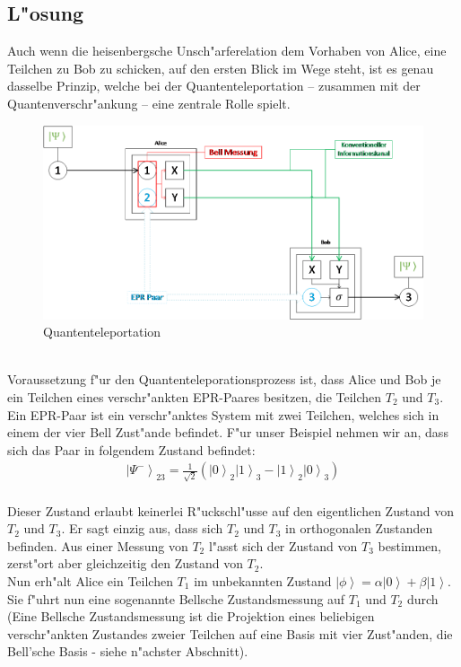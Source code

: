 \begin{refsection}
\section{L"osung}
Auch wenn die heisenbergsche Unsch"arferelation dem Vorhaben von Alice, eine Teilchen zu Bob zu schicken, auf den ersten Blick im Wege steht, ist es genau dasselbe Prinzip, welche bei der Quantenteleportation – zusammen mit der Quantenverschr"ankung – eine zentrale Rolle spielt.
\begin{figure}
	\center
	\includegraphics[width=1\textwidth]{teleport/image/quantum_teleportation.png}
	\caption{Quantenteleportation}
	\label{Quantenteleportation}
\end{figure}
\\
Voraussetzung f"ur den Quantenteleporationsprozess ist, dass Alice und Bob je ein Teilchen eines verschr"ankten EPR-Paares besitzen, die Teilchen $T_{2}$ und $T_{3}$. Ein EPR-Paar ist ein verschr"anktes System mit zwei Teilchen, welches sich in einem der vier Bell Zust"ande befindet. F"ur unser Beispiel nehmen wir an, dass sich das Paar in folgendem Zustand befindet:
\begin{align}\label{eq:bell_state1}
\left|\Psi^{-}\right\rangle_{23} = \frac{1}{\sqrt{2}} ( \left|0\right\rangle_{2}\left|1\right\rangle_{3} - \left|1\right\rangle_{2}\left|0\right\rangle_{3} )
\end{align}
\\
Dieser Zustand erlaubt keinerlei R"uckschl"usse auf den eigentlichen Zustand von $T_{2}$ und $T_{3}$. Er sagt einzig aus, dass sich $T_{2}$ und $T_{3}$ in orthogonalen Zustanden befinden. Aus einer Messung von $T_{2}$ l"asst sich der Zustand von $T_{3}$ bestimmen, zerst"ort aber gleichzeitig den Zustand von $T_{2}$. 
\\
Nun erh"alt Alice ein Teilchen $T_{1}$ im unbekannten Zustand $\left|\phi\right\rangle = \alpha\left|0\right\rangle + \beta\left|1\right\rangle$. Sie f"uhrt nun eine sogenannte Bellsche Zustandsmessung auf $T_{1}$ und $T_{2}$ durch (Eine Bellsche Zustandsmessung ist die Projektion eines beliebigen verschr"ankten Zustandes zweier Teilchen auf eine Basis mit vier Zust"anden, die Bell’sche Basis - siehe n"achster Abschnitt). 

\end{refsection}
